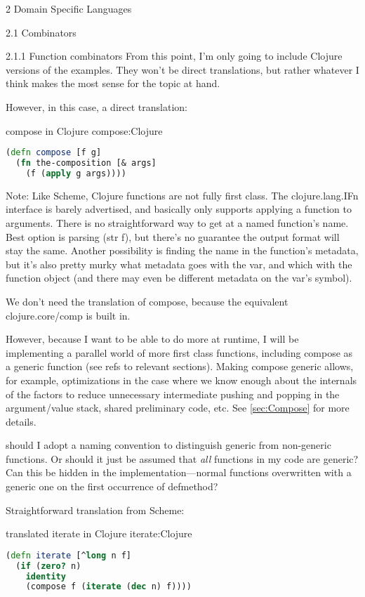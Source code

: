 \documentclass[11pt]{PalisadesLakesBook}
\begin{document}
\begin{plSection}{}
\begin{plSection}{2 Domain Specific Languages}
\begin{plSection}{2.1 Combinators}
\begin{plSection}{2.1.1 Function combinators}
From this point, I'm only going to include Clojure versions
of the examples.
They won't be direct translations, but rather whatever I think
makes the most sense for the topic at hand.

However, in this case, a direct translation:

\begin{plListing}
{{\clojureFont compose} in Clojure}
{compose:Clojure}
\begin{lstlisting}[language=clojure]
(defn compose [f g]
  (fn the-composition [& args]
    (f (apply g args))))
\end{lstlisting}
\end{plListing}

Note: Like Scheme, Clojure functions are not fully first class.
The {\javaFont clojure.lang.IFn} interface is barely advertised,
and basically only supports applying a function to arguments.
There is no straightforward way 
to get at a named function's name.
Best option is parsing {\clojureFont (str f)},
but there's no guarantee the output format will stay the same.
Another possibility is finding the name in the function's 
metadata, but it's also pretty murky
what metadata goes with the {\clojureFont var},
and which with the function object
(and there may even be different metadata on the 
{\clojureFont var}'s symbol).

We don't need the translation of {\schemeFont compose}, 
because the equivalent {\clojureFont clojure.core/comp}
is built in.

However, because I want to be able to do more at runtime,
I will be implementing a parallel world of more first class
functions, including {\clojureFont compose}
as a generic function (see \TODO refs to relevant sections).
Making {\clojureFont compose} generic allows,
for example, optimizations in the case where we know enough
about the internals of the factors to reduce unnecessary
intermediate pushing and popping in the argument/value stack,
shared preliminary code, etc.
See \cref{sec:Compose} for more details.

\TODO should I adopt a naming convention to distinguish
generic from non-generic functions. Or should it just be assumed
that \emph{all} functions in my code are generic?
Can this be hidden in the implementation---normal functions
overwritten with a generic one on the first occurrence
of {\clojureFont defmethod}?

Straightforward translation from Scheme:
\begin{plListing}
{translated {\clojureFont iterate} in Clojure}
{iterate:Clojure}
\begin{lstlisting}[language=clojure]
(defn iterate [^long n f]
  (if (zero? n)
    identity
    (compose f (iterate (dec n) f))))
    

\end{lstlisting}
\end{plListing}
\end{plSection}
\end{plSection}
\end{plSection}
\end{plSection}
\end{document}
